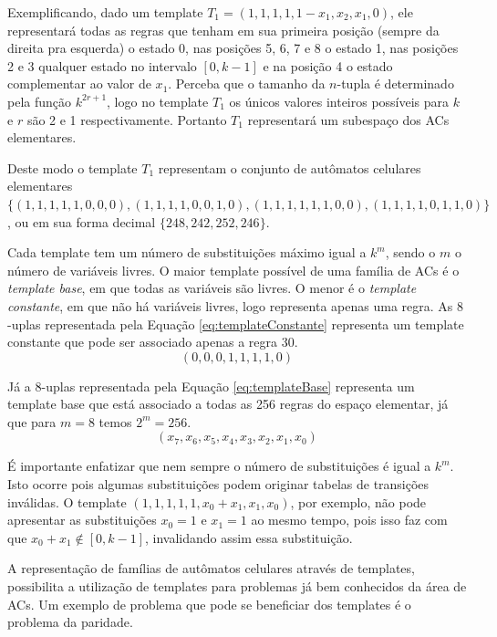 \documentclass[12pt,a4paper]{article}
\begin{document}
Exemplificando, dado um template $T_1 = (1,1,1,1,1-x_1,x_2,x_1,0)$, ele representará todas as regras que tenham em sua primeira posição (sempre da direita pra esquerda) o estado 0, nas posições 5, 6, 7 e 8 o estado 1, nas posições 2 e 3 qualquer estado no intervalo $[0,k-1]$ e na posição 4 o estado complementar ao valor de $x_1$. Perceba que o tamanho da $n$-tupla é determinado pela função $k^{2r+1}$, logo no template $T_1$ os únicos valores inteiros possíveis para $k$ e $r$ são 2 e 1 respectivamente. Portanto $T_1$ representará um subespaço dos ACs elementares.

Deste modo o template $T_1$ representam o conjunto de autômatos celulares elementares $\{(1,1,1,1,1,0,0,0),(1,1,1,1,0,0,1,0),(1,1,1,1,1,1,0,0),(1,1,1,1,0,1,1,0)\}$, ou em sua forma decimal $\{248,242,252,246\}$.

Cada template tem um número de substituições máximo igual a $k^m$, sendo o $m$ o número de variáveis livres. O maior template possível de uma família de ACs é o \textit{template base}, em que todas as variáveis são livres. O menor é o \textit{template constante}, em que não há variáveis livres, logo representa apenas uma regra. As $8$-uplas representada pela Equação \ref{eq:templateConstante} representa um template constante que pode ser associado apenas a regra 30. 
\begin{equation}
(0,0,0,1,1,1,1,0)
\label{eq:templateConstante}
\end{equation}

Já a $8$-uplas representada pela Equação \ref{eq:templateBase} representa um template base que está associado a todas as 256 regras do espaço elementar, já que para $m = 8$ temos $2^m = 256 $.
\begin{equation}
(x_7,x_6,x_5,x_4,x_3,x_2,x_1,x_0)
\label{eq:templateBase}
\end{equation}

É importante enfatizar que nem sempre o número de substituições é igual a $k^m$. Isto ocorre pois algumas substituições podem originar tabelas de transições inválidas. O template $(1,1,1,1,1,x_0+x_1,x_1,x_0)$, por exemplo, não pode apresentar as substituições $x_0=1$ e $x_1=1$ ao mesmo tempo, pois isso faz com que $x_0 + x_1 \notin [0, k-1]$, invalidando assim essa substituição.




A representação de famílias de autômatos celulares através de templates, possibilita a utilização de templates para problemas já bem conhecidos da área de ACs. Um exemplo de problema que pode se beneficiar dos templates é o problema da paridade.
\end{document}
